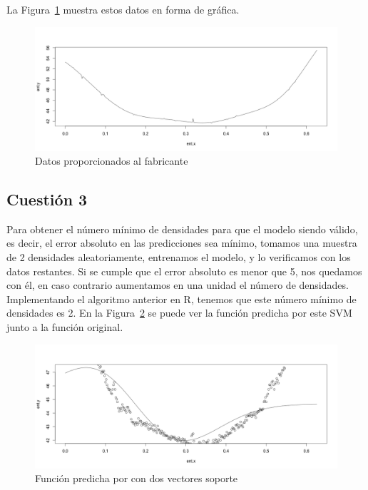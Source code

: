 \documentclass[12pt,a4paper,twoside,openright,titlepage,final]{article}
\begin{document}
La Figura~\ref{fig:plot_fabricante} muestra estos datos en forma de gráfica.\\

\begin{figure}
\centering
\includegraphics[width=0.8\linewidth]{imagenes/plot_fabricante}
\caption{Datos proporcionados al fabricante}
\label{fig:plot_fabricante}
\end{figure}

\subsection{Cuestión 3}

Para obtener el número mínimo de densidades para que el modelo siendo válido, es decir, el error absoluto en las predicciones sea mínimo, tomamos una muestra de 2 densidades aleatoriamente, entrenamos el modelo, y lo verificamos con los datos restantes. Si se cumple que el error absoluto es menor que 5, nos quedamos con él, en caso contrario aumentamos en una unidad el número de densidades.\\

Implementando el algoritmo anterior en R, tenemos que este número mínimo de densidades es 2. En la Figura~\ref{fig:2sv} se puede ver la función predicha por este SVM junto a la función original.\\

\begin{figure}
\centering
\includegraphics[width=0.8\linewidth]{imagenes/2sv}
\caption{Función predicha por con dos vectores soporte}
\label{fig:2sv}
\end{figure}
\end{document}
